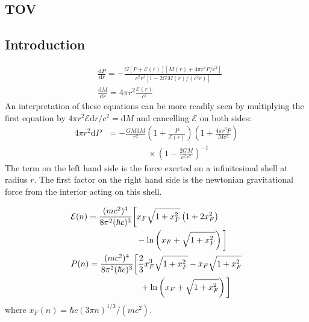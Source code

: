 \documentclass[twocolumn]{article}
\begin{document}
\begin{large}

\section*{TOV}
\subsection*{Introduction}
\begin{equation}
    \begin{split}
        &\frac{\text{d}P}{\text{d}r} = -\frac{G\left[P+\mathcal{E}(r)\right]\left[M(r)+4\pi r^3P/c^2\right]}{c^2r^2[1-2GM(r)/(c^2r)]} \\ 
        &\frac{\text{d}M}{\text{d}r} = 4\pi r^2\frac{\mathcal{E}(r)}{c^2}
    \end{split}
\end{equation}
An interpretation of these equations can be more readily seen by multiplying the first equation by $4\pi r^2\mathcal{E}\text{d}r/c^2 = \text{d}M$ and cancelling $\mathcal{E}$ on both sides:
\begin{equation}
    \begin{split}
        4\pi r^2\text{d}P &= -\frac{GM\text{d}M}{r^2}\left(1+\frac{P}{\mathcal{E}(r)}\right)\left(1+\frac{4\pi r^3P}{Mc^2}\right) \\ 
        &\hspace{2cm}\times\left(1-\frac{2GM}{c^2r^2}\right)^{-1}
    \end{split}
\end{equation}
The term on the left hand side is the force exerted on a infinitesimal shell at radius $r$. The first factor on the right hand side is the newtonian gravitational force from the interior acting on this shell.

\begin{equation}
    \label{24maj2054}
    \begin{split}
        &\mathcal{E}(n) = \frac{(mc^2)^4}{8\pi^2(\hbar c)^3}\bigg[x_F\sqrt{1+x_F^2}\left(1+2x_F^2\right) \\ 
        &\hspace{2.75cm}-\ln\left(x_F+\sqrt{1+x_F^2}\right)\bigg] \\ 
        &P(n) = \frac{(mc^2)^4}{8\pi^2(\hbar c)^3}\bigg[\frac{2}{3}x_F^3\sqrt{1+x_F^2}-x_F\sqrt{1+x_F^2} \\ 
        &\hspace{2.90cm}+\ln\left(x_F+\sqrt{1+x_F^2}\right)\bigg]
    \end{split}
\end{equation}
where $x_F(n)=\hbar c(3\pi n)^{1/3}/(mc^2)$.


\end{large}
\end{document}
